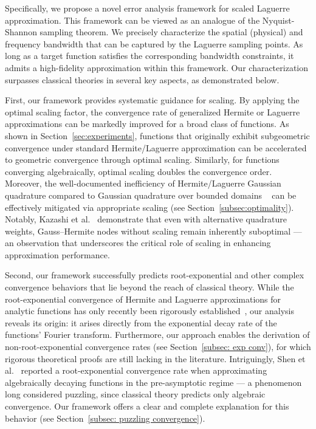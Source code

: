 \documentclass[pdflatex,sn-aps]{sn-jnl}%
\theoremstyle{thmstyleone}%
\theoremstyle{thmstyletwo}%
\theoremstyle{thmstylethree}%
\begin{document}
Specifically, we propose a novel error analysis framework for scaled Laguerre approximation. 
This framework can be viewed as an analogue of the Nyquist-Shannon sampling theorem. 
We precisely characterize the spatial (physical) and frequency bandwidth that can be 
captured by the Laguerre sampling points. As long as a target function satisfies the corresponding bandwidth constraints, it admits a high-fidelity approximation within this framework. Our characterization surpasses classical theories in several key aspects, as demonstrated below.

First, our framework provides systematic guidance for scaling. By applying the optimal scaling factor, the convergence rate of generalized Hermite or Laguerre approximations can be markedly improved for a broad class of functions.
As shown in Section~\ref{sec:experiments}, functions that originally exhibit subgeometric convergence under standard Hermite/Laguerre approximation can be accelerated to geometric convergence through optimal scaling. Similarly, for functions converging algebraically, optimal scaling doubles the convergence order. Moreover, the well-documented inefficiency of Hermite/Laguerre Gaussian quadrature compared to Gaussian quadrature over bounded domains
~\cite{trefethen2022exactness,kazashi_suboptimality_2023} can be effectively mitigated via appropriate scaling (see Section~\ref{subsec:optimality}). Notably, Kazashi et al.~\cite{kazashi_suboptimality_2023} demonstrate that even with alternative quadrature weights, Gauss--Hermite nodes without scaling remain inherently suboptimal --- an observation that underscores the critical role of scaling in enhancing approximation performance.

Second, our framework successfully predicts root-exponential and other complex convergence behaviors that lie beyond the reach of classical theory. While the root-exponential convergence of Hermite and Laguerre approximations for analytic functions has only recently been rigorously established~\cite{wang2024convergence,wang2025convergence},
our analysis reveals its origin: it arises directly from the exponential decay rate of the functions' Fourier transform. Furthermore, our approach enables the derivation of non-root-exponential convergence rates (see Section~\ref{subsec: exp conv}), for which rigorous theoretical proofs are still lacking in the literature. 
Intriguingly, Shen et al.~\cite{shen_new_2000,shen_recent_2009,shen2011spectral} reported a root-exponential convergence rate when approximating algebraically decaying functions in the pre-asymptotic regime --- a phenomenon long considered puzzling, since classical theory predicts only algebraic convergence. Our framework offers a clear and complete explanation for this behavior (see Section~\ref{subsec: puzzling convergence}).
\end{document}
